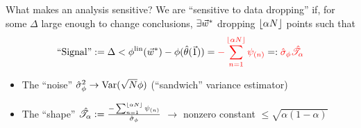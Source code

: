 





\begin{frame}{What makes an analysis sensitive?}
%
We are ``sensitive to data dropping'' if, for some $\Delta$ large enough to
change conclusions, $\exists \vec{w}^*$ dropping $\lfloor \alpha N \rfloor$ points such that
%
\begin{align*}
%
\textrm{``Signal''} :=
\Delta < \thetafunlin(\w^*) - \thetafun(\thetahat(\onevec))  =
    {\color{red}- \sum_{n=1}^{\lfloor \alpha N \rfloor} \infl_{(n)} }
    =:  {\color{red} \noise } { \color{red} \shape}
%
\end{align*}
%

\begin{itemize}
\item The ``noise'' $\hat\sigma_{\phi}^2 \rightarrow \mathrm{Var}(\sqrt{N}\phi)$
    (``sandwich'' variance estimator)
\item The ``shape''
    $\hat{\mathscr{T}}_\alpha := \frac{-\sum_{n=1}^{\lfloor \alpha N \rfloor} \psi_{(n)}}{\hat\sigma_{\phi}}$
    $\rightarrow$ nonzero constant
    $\le \sqrt{\alpha (1 - \alpha)}$
\end{itemize}

\begin{center}
\begin{minipage}{0.8\textwidth}
\end{minipage}
\end{center}

\end{frame}



